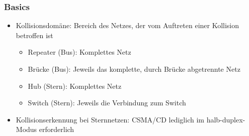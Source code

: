 \subsubsection{Basics}
\begin{itemize}
	\item Kollisionsdomäne: Bereich des Netzes, der vom Auftreten einer Kollision betroffen ist
	\begin{itemize}
		\item Repeater (Bus): Komplettes Netz
		\item Brücke (Bus): Jeweils das komplette, durch Brücke abgetrennte Netz
		\item Hub (Stern): Komplettes Netz
		\item Switch (Stern): Jeweils die Verbindung zum Switch
	\end{itemize}
	\item Kollisionserkennung bei Sternnetzen: CSMA/CD lediglich im halb-duplex-Modus erforderlich
\end{itemize}

